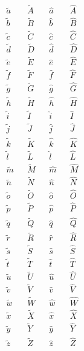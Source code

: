 \begin{align*}
  \tilde a        &&     \tilde A&&  \hat a        &&     \hat A\\
  \tilde b        &&     \tilde B&&  \hat b        &&     \hat B\\
  \tilde c        &&     \tilde C&&  \hat c        &&     \hat C\\
  \tilde d        &&     \tilde D&&  \hat d        &&     \hat D\\
  \tilde e        &&     \tilde E&&  \hat e        &&     \hat E\\
  \tilde f        &&     \tilde F&&  \hat f        &&     \hat F\\
  \tilde g        &&     \tilde G&&  \hat g        &&     \hat G\\
  \tilde h        &&     \tilde H&&  \hat h        &&     \hat H\\
  \tilde i        &&     \tilde I&&  \hat i        &&     \hat I\\
  \tilde j        &&     \tilde J&&  \hat j        &&     \hat J\\
  \tilde k        &&     \tilde K&&  \hat k        &&     \hat K\\
  \tilde l        &&     \tilde L&&  \hat l        &&     \hat L\\
  \tilde m        &&     \tilde M&&  \hat m        &&     \hat M\\
  \tilde n        &&     \tilde N&&  \hat n        &&     \hat N\\
  \tilde o        &&     \tilde O&&  \hat o        &&     \hat O\\
  \tilde p        &&     \tilde P&&  \hat p        &&     \hat P\\
  \tilde q        &&     \tilde Q&&  \hat q        &&     \hat Q\\
  \tilde r        &&     \tilde R&&  \hat r        &&     \hat R\\
  \tilde s        &&     \tilde S&&  \hat s        &&     \hat S\\
  \tilde t        &&     \tilde T&&  \hat t        &&     \hat T\\
  \tilde u        &&     \tilde U&&  \hat u        &&     \hat U\\
  \tilde v        &&     \tilde V&&  \hat v        &&     \hat V\\
  \tilde w        &&     \tilde W&&  \hat w        &&     \hat W\\
  \tilde x        &&     \tilde X&&  \hat x        &&     \hat X\\
  \tilde y        &&     \tilde Y&&  \hat y        &&     \hat Y\\
  \tilde z        &&     \tilde Z&&  \hat z        &&     \hat Z
\end{align*}

